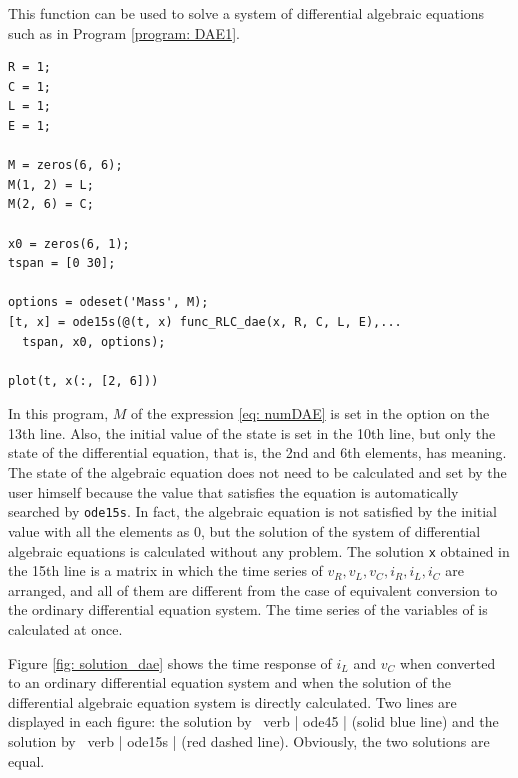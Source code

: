 \documentclass[graybox, envcountchap]{svmult}
\begin{document}
\begin{example}
This function can be used to solve a system of differential algebraic equations such as in Program \nobreak\ref{program: DAE1}.

\smallskip
\begin{PROGRAMA}[count,title={main\_RLC\_dae.m}]\label{program:DAE1}
\begin{verbatim}
R = 1;
C = 1;
L = 1;
E = 1;

M = zeros(6, 6);
M(1, 2) = L;
M(2, 6) = C;

x0 = zeros(6, 1);
tspan = [0 30];

options = odeset('Mass', M);
[t, x] = ode15s(@(t, x) func_RLC_dae(x, R, C, L, E),...
  tspan, x0, options);

plot(t, x(:, [2, 6]))
\end{verbatim}
\end{PROGRAMA}


In this program, $M$ of the expression \ref{eq: numDAE} is set in the option on the 13th line.
Also, the initial value of the state is set in the 10th line, but only the state of the differential equation, that is, the 2nd and 6th elements, has meaning.
The state of the algebraic equation does not need to be calculated and set by the user himself because the value that satisfies the equation is automatically searched by \verb|ode15s|.
In fact, the algebraic equation is not satisfied by the initial value with all the elements as $0$, but the solution of the system of differential algebraic equations is calculated without any problem.
The solution \verb|x| obtained in the 15th line is a matrix in which the time series of $v_R, v_L, v_C, i_R, i_L, i_C$ are arranged, and all of them are different from the case of equivalent conversion to the ordinary differential equation system.
The time series of the variables of is calculated at once.

Figure \ref{fig: solution_dae} shows the time response of $ i_L $ and $ v_C $ when converted to an ordinary differential equation system and when the solution of the differential algebraic equation system is directly calculated. Two lines are displayed in each figure: the solution by \ verb | ode45 | (solid blue line) and the solution by \ verb | ode15s | (red dashed line). Obviously, the two solutions are equal.



\end{example}
\end{document}
